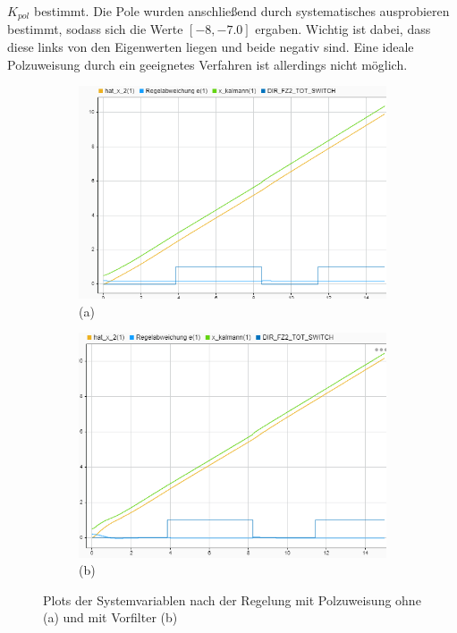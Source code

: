 $K_{pol}$ bestimmt. Die Pole wurden anschließend durch systematisches
ausprobieren bestimmt, sodass sich die Werte $[-8, -7.0]$ ergaben. Wichtig ist
dabei, dass diese links von den Eigenwerten liegen und beide negativ sind. Eine
ideale Polzuweisung durch ein geeignetes Verfahren ist allerdings nicht möglich.
\begin{figure}[hbt]
\centering
\begin{subfigure}{0.49\textwidth}
    \centering
    \includegraphics*[width=\textwidth]{figures/polzuw_raw.png}\\
    (a)
\end{subfigure}
\begin{subfigure}{0.49\textwidth}
    \centering
    \includegraphics*[width=\textwidth]{figures/polzuw_off.png}\\
    (b)
\end{subfigure}
    \caption{Plots der Systemvariablen nach der Regelung mit Polzuweisung ohne
        (a) und mit Vorfilter (b)
    \label{fig:polplot}}
\end{figure}    

